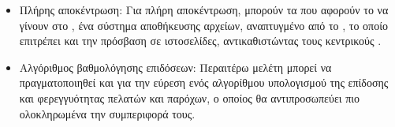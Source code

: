 \begin{itemize}
\item Πλήρης αποκέντρωση: Για πλήρη αποκέντρωση, μπορούν τα  που αφορούν το  να γίνουν  στο , ένα  σύστημα αποθήκευσης αρχείων, αναπτυγμένο από το , το οποίο επιτρέπει και την πρόσβαση σε ιστοσελίδες, αντικαθιστώντας τους κεντρικούς  \cite{ref45}.
\item Αλγόριθμος βαθμολόγησης επιδόσεων: Περαιτέρω μελέτη μπορεί να πραγματοποιηθεί και για την εύρεση ενός αλγορίθμου υπολογισμού της επίδοσης και φερεγγυότητας πελατών και παρόχων, ο οποίος θα αντιπροσωπεύει πιο ολοκληρωμένα την συμπεριφορά τους.
\end{itemize}



